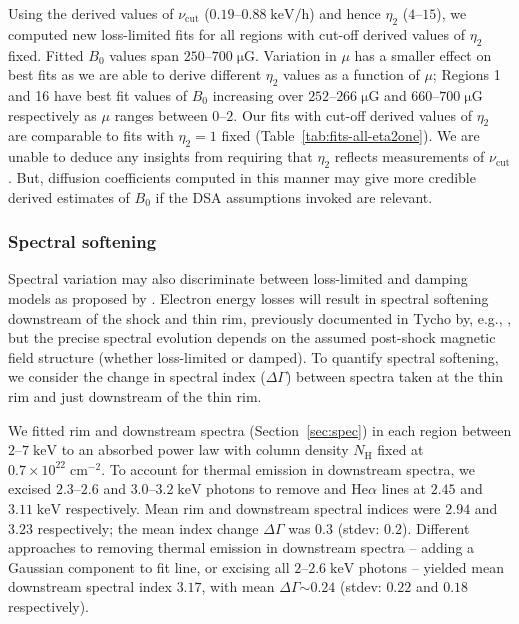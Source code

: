 \documentclass[iop, apj, numberedappendix]{emulateapj}
\newcommand*{\mt}{\mathrm}
\newcommand*{\unit}[1]{\;\mt{#1}}  %
\newcommand*{\abt}{\mathord{\sim}} %
\newcommand*{\muG}{\unit{\mu G}}
\begin{document}
Using the derived values of $\nu_{\mt{cut}}$ ($0.19$--$0.88 \unit{keV/h}$) and
hence $\eta_2$ ($4$--$15$), we computed new loss-limited fits for all regions
with cut-off derived values of $\eta_2$ fixed.  Fitted $B_0$ values span
$250$--$700 \muG$.  Variation in $\mu$ has a smaller effect on best fits as we
are able to derive different $\eta_2$ values as a function of $\mu$; Regions 1
and 16 have best fit values of $B_0$ increasing over $252$--$266 \muG$ and
$660$--$700 \muG$ respectively as $\mu$ ranges between $0$--$2$.  Our fits with
cut-off derived values of $\eta_2$ are comparable to fits with $\eta_2 = 1$
fixed (Table~\ref{tab:fits-all-eta2one}).  We are unable to deduce any insights
from requiring that $\eta_2$ reflects measurements of $\nu_{\mt{cut}}$.  But,
diffusion coefficients computed in this manner may give more credible derived
estimates of $B_0$ if the DSA assumptions invoked are relevant.

\subsubsection{Spectral softening}

Spectral variation may also discriminate between loss-limited and damping
models as proposed by \citet{rettig2012}.  Electron energy losses will result
in spectral softening downstream of the shock and thin rim, previously
documented in Tycho by, e.g., \citet{cassam-chenai2007}, but the precise
spectral evolution depends on the assumed post-shock magnetic field structure
(whether loss-limited or damped).  To quantify spectral softening, we consider
the change in spectral index ($\Delta \Gamma$) between spectra taken at the
thin rim and just downstream of the thin rim.

We fitted rim and downstream spectra (Section~\ref{sec:spec}) in each region
between $2$--$7 \unit{keV}$ to an absorbed power law with column density
$N_{\mt{H}}$ fixed at $0.7 \times 10^{22} \unit{cm^{-2}}$.  To account for
thermal emission in downstream spectra, we excised $2.3$--$2.6$ and
$3.0$--$3.2 \unit{keV}$ photons to remove  and 
He$\alpha$ lines at $2.45$ and $3.11 \unit{keV}$ respectively.  Mean rim and
downstream spectral indices were $2.94$ and $3.23$ respectively; the mean
index change $\Delta \Gamma$ was $0.3$ (stdev: $0.2$).  Different approaches to
removing thermal emission in downstream spectra -- adding a Gaussian component
to fit  line, or excising all $2$--$2.6 \unit{keV}$ photons --
yielded mean downstream spectral index $3.17$, with mean $\Delta \Gamma \abt
0.24$ (stdev: $0.22$ and $0.18$ respectively).
\end{document}
